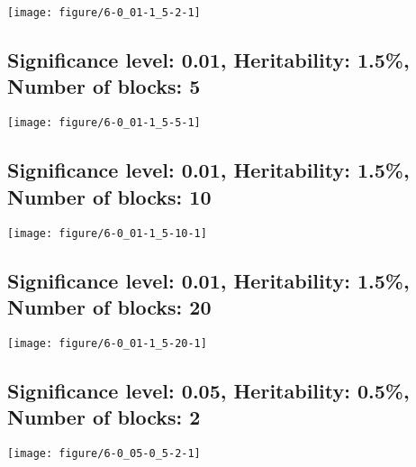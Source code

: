 \documentclass[11pt,letter]{article}\usepackage[]{graphicx}\usepackage[]{color}
\makeatletter
\def\maxwidth{ %
  \ifdim\Gin@nat@width>\linewidth
    \linewidth
  \else
    \Gin@nat@width
  \fi
}
\newenvironment{knitrout}{}{} %
\makeatother
\begin{document}
\begin{knitrout}
\color{fgcolor}
\texttt{[image: figure/6-0\_01-1\_5-2-1]} 

\end{knitrout}

\newpage
\subsection{Significance level: 0.01, Heritability: 1.5\%, Number of blocks: 5}

\begin{knitrout}
\color{fgcolor}
\texttt{[image: figure/6-0\_01-1\_5-5-1]} 

\end{knitrout}

\newpage
\subsection{Significance level: 0.01, Heritability: 1.5\%, Number of blocks: 10}

\begin{knitrout}
\color{fgcolor}
\texttt{[image: figure/6-0\_01-1\_5-10-1]} 

\end{knitrout}

\newpage
\subsection{Significance level: 0.01, Heritability: 1.5\%, Number of blocks: 20}

\begin{knitrout}
\color{fgcolor}
\texttt{[image: figure/6-0\_01-1\_5-20-1]} 

\end{knitrout}

\newpage
\subsection{Significance level: 0.05, Heritability: 0.5\%, Number of blocks: 2}

\begin{knitrout}
\color{fgcolor}
\texttt{[image: figure/6-0\_05-0\_5-2-1]} 

\end{knitrout}
\end{document}
